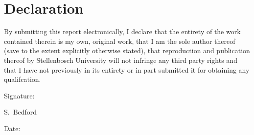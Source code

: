 \chapter{Declaration}

By submitting this report electronically, I declare that the entirety of the work contained
therein is my own, original work, that I am the sole author thereof (save to the extent
explicitly otherwise stated), that reproduction and publication thereof by Stellenbosch
University will not infringe any third party rights and that I have not previously in its
entirety or in part submitted it for obtaining any qualifcation.

\vspace{3cm}

\noindent%
\parbox{.5\textwidth}{%
  Signature:\quad\dotfill\par
  \hfill S.\ Bedford\hspace{1.2cm}\null}


\vspace{1.5cm}
\noindent%
\parbox{.5\textwidth}{%
  Date:\quad\dotfill\par}
